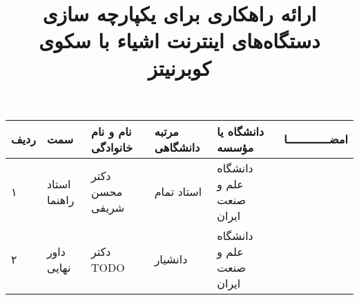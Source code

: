 \subject{مهندسی کامپیوتر}
\title{ارائه راهکاری برای یکپارچه سازی دستگاه‌های اینترنت اشیاء با سکوی کوبرنیتز}


\firstPage
\davaranPage

\begin{center}
    \begin{tabular}{| p{8mm} | p{18mm} | p{} |p{14mm}|p{}|c|}
        \hline
        ردیف & سمت          & نام و نام خانوادگی           & مرتبه \newline دانشگاهی & دانشگاه یا مؤسسه                  & امضـــــــــــــا \\
        \hline
        ۱    & استاد راهنما & دکتر \newline محسن شریفی & استاد تمام                 & دانشگاه \newline علم و صنعت ایران &                   \\
        \hline
        ۲    & داور نهایی   & دکتر \newline  TODO        & دانشیار                 & دانشگاه \newline علم و صنعت ایران &                   \\
        \hline
    \end{tabular}
\end{center}


